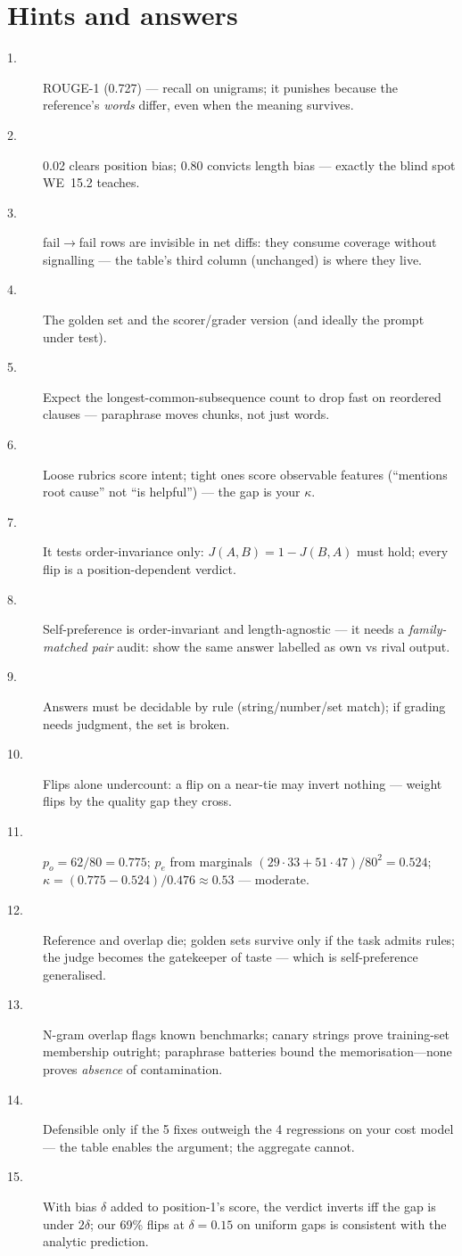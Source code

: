 \section*{Hints and answers}
\begin{description}
\item[1.] ROUGE-1 (0.727) --- recall on unigrams; it punishes because
the reference's \emph{words} differ, even when the meaning survives.
\item[2.] 0.02 clears position bias; 0.80 convicts length bias ---
exactly the blind spot WE~15.2 teaches.
\item[3.] fail$\to$fail rows are invisible in net diffs: they consume
coverage without signalling --- the table's third column (unchanged)
is where they live.
\item[4.] The golden set and the scorer/grader version (and ideally
the prompt under test).
\item[5.] Expect the longest-common-subsequence count to drop fast
on reordered clauses --- paraphrase moves chunks, not just words.
\item[6.] Loose rubrics score intent; tight ones score observable
features (``mentions root cause'' not ``is helpful'') --- the gap is
your $\kappa$.
\item[7.] It tests order-invariance only: $J(A,B) = 1 - J(B,A)$
must hold; every flip is a position-dependent verdict.
\item[8.] Self-preference is order-invariant and length-agnostic ---
it needs a \emph{family-matched pair} audit: show the same answer
labelled as own vs rival output.
\item[9.] Answers must be decidable by rule (string/number/set match);
if grading needs judgment, the set is broken.
\item[10.] Flips alone undercount: a flip on a near-tie may invert
nothing --- weight flips by the quality gap they cross.
\item[11.] $p_o = 62/80 = 0.775$; $p_e$ from marginals $(29\cdot33 +
51\cdot47)/80^2 = 0.524$; $\kappa = (0.775-0.524)/0.476 \approx
0.53$ --- moderate.
\item[12.] Reference and overlap die; golden sets survive only if the
task admits rules; the judge becomes the gatekeeper of taste ---
which is self-preference generalised.
\item[13.] N-gram overlap flags known benchmarks; canary strings
prove training-set membership outright; paraphrase batteries bound
the memorisation---none proves \emph{absence} of contamination.
\item[14.] Defensible only if the 5 fixes outweigh the 4 regressions
on your cost model --- the table enables the argument; the aggregate
cannot.
\item[15.] With bias $\delta$ added to position-1's score, the verdict
inverts iff the gap is under $2\delta$; our 69\% flips at
$\delta{=}0.15$ on uniform gaps is consistent with the analytic
prediction.
\end{description}

